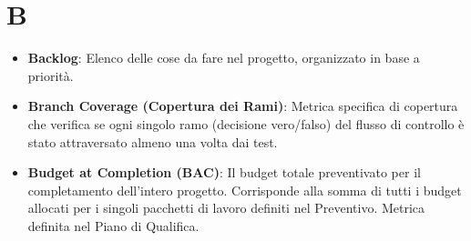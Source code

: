 \documentclass[11pt,a4paper]{article}
\begin{document}
\section*{B}
\begin{itemize}
\item \textbf{Backlog}: Elenco delle cose da fare nel progetto, organizzato in base a priorità.

\item \textbf{Branch Coverage (Copertura dei Rami)}: Metrica specifica di copertura che verifica se ogni singolo ramo (decisione vero/falso) del flusso di controllo è stato attraversato almeno una volta dai test.

\item \textbf{Budget at Completion (BAC)}: Il budget totale preventivato per il completamento dell'intero progetto. Corrisponde alla somma di tutti i budget allocati per i singoli pacchetti di lavoro definiti nel Preventivo. Metrica definita nel Piano di Qualifica.

\end{itemize}
\newpage
\end{document}
